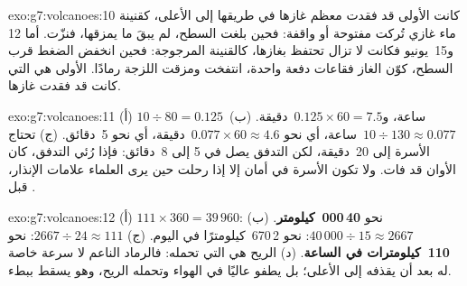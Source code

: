 \begin{solution}{exo:g7:volcanoes:10}
كانت  الأولى قد فقدت معظم غازها في طريقها إلى الأعلى، كقنينة
ماء غازي تُركت مفتوحة أو واقفة: فحين بلغت السطح، لم
يبقَ ما يمزقها، فنزّت. أما  12
و15~يونيو فكانت لا تزال تحتفظ بغازها، كالقنينة المرجوجة: فحين انخفض
الضغط قرب السطح، كوّن الغاز فقاعات دفعة واحدة،
انتفخت ومزقت  اللزجة رمادًا.  الأولى هي التي
كانت قد فقدت غازها.
\end{solution}

\begin{solution}{exo:g7:volcanoes:11}
(أ) $10 \div 80 = 0.125$~ساعة، و$0.125 \times 60 = 7.5$~دقيقة. (ب)
$10 \div 130 \approx 0.077$~ساعة، أي نحو $0.077 \times 60 \approx
4.6$~دقيقة، أي نحو 5~دقائق. (ج) تحتاج الأسرة إلى 20~دقيقة، لكن
التدفق يصل في 5 إلى 8~دقائق: فإذا رُئي التدفق، كان الأوان قد فات. ولا
تكون الأسرة في أمان إلا إذا رحلت حين يرى العلماء علامات
الإنذار، قبل .
\end{solution}

\begin{solution}{exo:g7:volcanoes:12}
(أ) $111 \times 360 = 39\,960$: نحو \textbf{40\,000~كيلومتر}. (ب)
$40\,000 \div 15 \approx 2667$: نحو 2\,670~كيلومترًا في اليوم. (ج)
$2667 \div 24 \approx 111$: نحو \textbf{110~كيلومترات في الساعة}. (د) الريح هي التي
تحمله: فالرماد الناعم لا سرعة خاصة له بعد أن يقذفه
 إلى الأعلى؛ بل يطفو عاليًا في الهواء وتحمله الريح، وهو يسقط
ببطء.
\end{solution}

